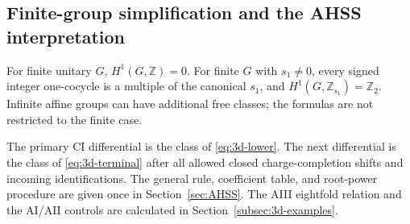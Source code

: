 \subsection{Finite-group simplification and the AHSS interpretation}
For finite unitary $G$, $H^1(G,\mathbb Z)=0$. For finite $G$ with $s_1\ne0$, every signed integer one-cocycle is a multiple of the canonical $s_1$, and $H^1(G,\mathbb Z_{s_1})=\mathbb Z_2$. Infinite affine groups can have additional free classes; the formulas are not restricted to the finite case.

The primary CI differential is the class of \eqref{eq:3d-lower}. The next differential is the class of \eqref{eq:3d-terminal} after all allowed closed charge-completion shifts and incoming identifications. The general rule, coefficient table, and root-power procedure are given once in Section~\ref{sec:AHSS}. The AIII eightfold relation and the AI/AII controls are calculated in Section~\ref{subsec:3d-examples}.

